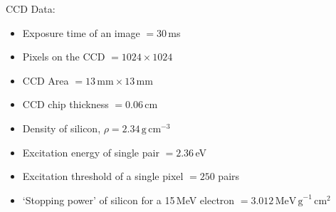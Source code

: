 CCD Data:
\begin{itemize}
\item Exposure time of an image $= 30$\,ms
\item Pixels on the CCD $= 1024 \times 1024$
\item CCD Area $= 13\,\mathrm{mm} \times 13\,\mathrm{mm}$
\item CCD chip thickness $= 0.06$\,cm
\item Density of silicon, $\rho = 2.34\,\mathrm{g\,cm}^{-3}$
\item Excitation energy of single pair $= 2.36$\,eV
\item Excitation threshold of a single pixel $= 250$ pairs
\item `Stopping power' of silicon for a 15\,MeV electron
  $= 3.012\,\mathrm{MeV\,g}^{-1}\,\mathrm{cm}^{2}$
\end{itemize}
